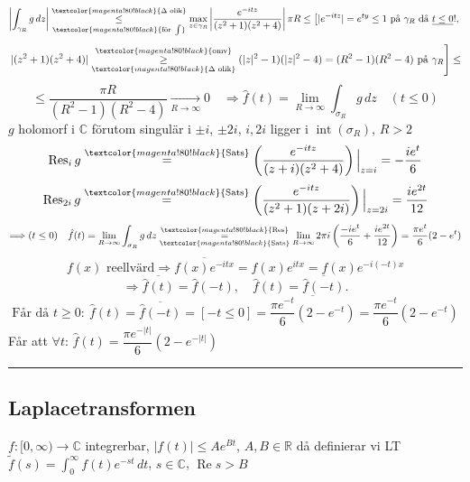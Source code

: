 \[ \left| \int_{\gamma_R} g\,dz \right| \underset{\textcolor{magenta!80!black}{\text{för } \int}}{\overset{\textcolor{magenta!80!black}{\Delta \text{ olik}}}{\le}} \max_{z \in \gamma_R} \left| \frac{e^{-itz}}{(z^2 + 1)(z^2 + 4)} \right| \pi R \le \left[ |e^{-itz}| = e^{ty} \le 1 \text{ på } \gamma_R \text{ då } \underline{t \le 0}! , \right. \]
\[ \left. |(z^2 + 1)(z^2 + 4)| \underset{\textcolor{magenta!80!black}{\Delta \text{ olik}}}{\overset{\textcolor{magenta!80!black}{\text{omv}}}{\ge}} (|z|^2 - 1)(|z|^2 - 4) = (R^2 - 1)(R^2 - 4) \text{ på } \gamma_R \right] \le \]
\[ \le \frac{\pi R}{(R^2 - 1)(R^2 - 4)} \xrightarrow[R \to \infty]{} 0 \quad \Rightarrow \hat{f}(t) = \lim_{R \to \infty} \int_{\sigma_R} g\,dz \quad (t \le 0) \]
$g$ holomorf i $\mathbb{C}$ förutom singulär i $\pm i$, $\pm 2i$, $i, 2i$ ligger i $\operatorname{int}(\sigma_R)$, $R > 2$
\[ \operatorname{Res}_i g \overset{\textcolor{magenta!80!black}{\text{Sats}}}{=} \left( \frac{e^{-itz}}{(z + i)(z^2 + 4)} \right) \Big|_{z = i} = -\frac{ie^t}{6} \]
\[ \operatorname{Res}_{2i} g \overset{\textcolor{magenta!80!black}{\text{Sats}}}{=} \left( \frac{e^{-itz}}{(z^2 + 1)(z + 2i)} \right) \Big|_{z = 2i} = \frac{ie^{2t}}{12} \]
\[ \Longrightarrow (t \le 0) \quad \hat{f}(t) = \lim_{R \to \infty} \int_{\sigma_R} g\,dz \underset{\textcolor{magenta!80!black}{\text{Sats}}}{\overset{\textcolor{magenta!80!black}{\text{Res}}}{=}} \lim_{R \to \infty} 2\pi i\left( \frac{-ie^t}{6} + \frac{ie^{2t}}{12} \right) = \frac{\pi e^t}{6}(2 - e^t) \]
\[ f(x) \text{ reellvärd} \Longrightarrow \overline{f(x)e^{-itx}} = f(x)e^{itx} = f(x)e^{-i(-t)x} \]
\[ \Longrightarrow \overline{\hat{f}(t)} = \hat{f}(-t), \quad \hat{f}(t) = \overline{\hat{f}(-t)}. \]
\[ \text{Får då } t \ge 0: \ \hat{f}(t) = \overline{\hat{f}(-t)} = [-t \le 0] = \overline{\frac{\pi e^{-t}}{6}(2 - e^{-t})} = \frac{\pi e^{-t}}{6}(2 - e^{-t}) \]
Får att $\forall t$: $\hat{f}(t) = \dfrac{\pi e^{-|t|}}{6}(2 - e^{-|t|})$

\noindent\rule{\linewidth}{0.4pt}

\subsection{Laplacetransformen}
\begin{definition}
$f : [0, \infty) \to \mathbb{C}$ integrerbar, $|f(t)| \le Ae^{Bt}$, $A, B \in \mathbb{R}$ då definierar vi LT $\tilde{f}(s) = \displaystyle\int_0^\infty f(t)e^{-st}\,dt$, $s \in \mathbb{C}$, $\operatorname{Re} s > B$
\end{definition}


